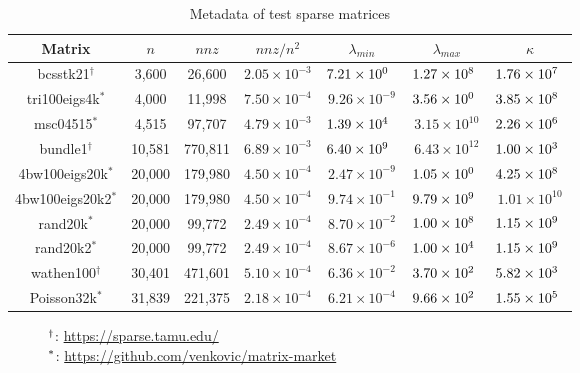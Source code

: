 \documentclass[numbers,webpdf,imanum]{ima-authoring-template}%
\theoremstyle{thmstyletwo}%
\numberwithin{equation}{section}
\begin{document}
\begin{table}
\caption{Metadata of test sparse matrices}
\label{tab:metadata-sparse-matrices}
\begin{tabular}{ccccccc}
\toprule
Matrix & $n$ & $nnz$ & $nnz/n^2$ & $\lambda_{min}$ & $\lambda_{max}$ & $\kappa$\\
\midrule
bcsstk21${}^{\dagger}$ & 3,600 & 26,600 & $2.05\times 10^{-3}$ & $7.21\times 10^{0\hphantom{-}}$ & $1.27\times 10^{8\hphantom{0}}$ & $1.76\times 10^{7\hphantom{0}}$ \\
tri100eigs4k${}^{*}$ & 4,000 & 11,998  & $7.50\times 10^{-4}$ & $9.26\times 10^{-9}$ & $3.56\times 10^{0\hphantom{0}}$&  $3.85\times 10^{8\hphantom{0}}$ \\
msc04515${}^{*}$ & 4,515 & 97,707 & $4.79\times 10^{-3}$ & $1.39\times 10^{4\hphantom{-}}$ & $3.15\times 10^{10}$ & $2.26\times 10^{6\hphantom{0}}$\\
\midrule
bundle1${}^\dagger$ & 10,581 & 770,811 & $6.89\times 10^{-3}$ & $6.40\times 10^{9\hphantom{-}}$ & $6.43\times 10^{12}$ & $1.00\times 10^{3\hphantom{0}}$ \\
4bw100eigs20k${}^{*}$ & 20,000 & 179,980 & $4.50\times 10^{-4}$  & $2.47\times 10^{-9}$ & $1.05\times 10^{0\hphantom{0}}$ & $4.25\times 10^{8\hphantom{0}}$ \\
4bw100eigs20k2${}^{*}$ & 20,000 & 179,980 & $4.50\times 10^{-4}$ & $9.74\times 10^{-1}$ & $9.79\times 10^{9\hphantom{0}}$ & $1.01\times 10^{10}$ \\
rand20k${}^{*}$ & 20,000 & 99,772 & $2.49\times 10^{-4}$&$8.70\times 10^{-2}$&$1.00\times 10^{8\hphantom{0}}$&$1.15\times 10^{9\hphantom{0}}$\\
rand20k2${}^{*}$ & 20,000 & 99,772 & $2.49\times 10^{-4}$ & $8.67\times 10^{-6}$ & $1.00\times 10^{4\hphantom{0}}$&$1.15\times 10^{9\hphantom{0}}$\\	
wathen100${}^\dagger$ & 30,401 & 471,601 & $5.10\times 10^{-4}$ & $6.36\times 10^{-2}$ & $3.70\times 10^{2\hphantom{0}}$ & $5.82\times 10^{3\hphantom{0}}$ \\
Poisson32k${}^*$ & 31,839 & 221,375 & $2.18\times 10^{-4}$ & $6.21\times 10^{-4}$ & $9.66\times 10^{2\hphantom{0}}$ & $1.55\times 10^{5\hphantom{0}}$ \\
\bottomrule
\end{tabular}
{\footnotesize$\hspace*{1cm}{}^\dagger$: \url{https://sparse.tamu.edu/}}\\
{\footnotesize$\hspace*{1cm}{}^*$: \url{https://github.com/venkovic/matrix-market}}
\end{table}
\end{document}
